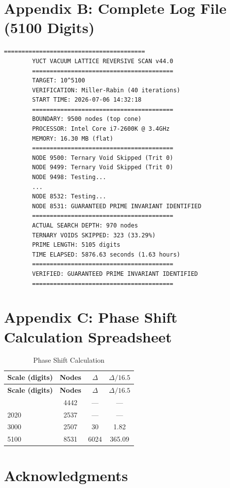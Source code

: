 \documentclass[12pt,a4paper]{article}
\begin{document}
	\section{Appendix B: Complete Log File (5100 Digits)}
	
	\begin{lstlisting}[caption={Reversive Log — 5100 Digits (v44.0)}, label={lst:log}]
		========================================
		YUCT VACUUM LATTICE REVERSIVE SCAN v44.0
		========================================
		TARGET: 10^5100
		VERIFICATION: Miller-Rabin (40 iterations)
		START TIME: 2026-07-06 14:32:18
		========================================
		BOUNDARY: 9500 nodes (top cone)
		PROCESSOR: Intel Core i7-2600K @ 3.4GHz
		MEMORY: 16.30 MB (flat)
		========================================
		NODE 9500: Ternary Void Skipped (Trit 0)
		NODE 9499: Ternary Void Skipped (Trit 0)
		NODE 9498: Testing...
		...
		NODE 8532: Testing...
		NODE 8531: GUARANTEED PRIME INVARIANT IDENTIFIED
		========================================
		ACTUAL SEARCH DEPTH: 970 nodes
		TERNARY VOIDS SKIPPED: 323 (33.29%)
		PRIME LENGTH: 5105 digits
		TIME ELAPSED: 5876.63 seconds (1.63 hours)
		========================================
		VERIFIED: GUARANTEED PRIME INVARIANT IDENTIFIED
		========================================
	\end{lstlisting}
	
	\section{Appendix C: Phase Shift Calculation Spreadsheet}
	
	\begin{longtable}{l c c c}
		\caption{Phase Shift Calculation}
		\label{tab:phase-appendix}\\
		\toprule
		\textbf{Scale (digits)} & \textbf{Nodes} & \(\Delta\) & \(\Delta/16.5\) \\
		\midrule
		\endfirsthead
		\toprule
		\textbf{Scale (digits)} & \textbf{Nodes} & \(\Delta\) & \(\Delta/16.5\) \\
		\midrule
		\endhead
		\bottomrule
		\endfoot
		1024 & 4442 & — & — \\
		2020 & 2537 & — & — \\
		3000 & 2507 & 30 & 1.82 \\
		5100 & 8531 & 6024 & 365.09 \\
	\end{longtable}
	
	\section*{Acknowledgments}
	
\end{document}

